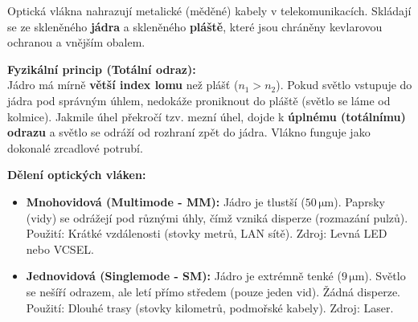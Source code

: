 \documentclass[a4paper,10pt]{article}
\begin{document}
\begin{vysvetlenibox}
Optická vlákna nahrazují metalické (měděné) kabely v telekomunikacích. Skládají se ze skleněného \textbf{jádra} a skleněného \textbf{pláště}, které jsou chráněny kevlarovou ochranou a vnějším obalem.

\textbf{Fyzikální princip (Totální odraz):}\\
Jádro má mírně \textbf{větší index lomu} než plášť ($n_1 > n_2$). Pokud světlo vstupuje do jádra pod správným úhlem, nedokáže proniknout do pláště (světlo se láme od kolmice). Jakmile úhel překročí tzv. mezní úhel, dojde k \textbf{úplnému (totálnímu) odrazu} a světlo se odráží od rozhraní zpět do jádra. Vlákno funguje jako dokonalé zrcadlové potrubí.

\begin{center}
\end{center}

\begin{durazbox}
\textbf{Dělení optických vláken:}
\begin{itemize}
    \item \textbf{Mnohovidová (Multimode - MM):} Jádro je tlustší ($50\,\mathrm{\mu m}$). Paprsky (vidy) se odrážejí pod různými úhly, čímž vzniká disperze (rozmazání pulzů). Použití: Krátké vzdálenosti (stovky metrů, LAN sítě). Zdroj: Levná LED nebo VCSEL.
    \item \textbf{Jednovidová (Singlemode - SM):} Jádro je extrémně tenké ($9\,\mathrm{\mu m}$). Světlo se nešíří odrazem, ale letí přímo středem (pouze jeden vid). Žádná disperze. Použití: Dlouhé trasy (stovky kilometrů, podmořské kabely). Zdroj: Laser.
\end{itemize}
\end{durazbox}


\end{vysvetlenibox}
\end{document}
